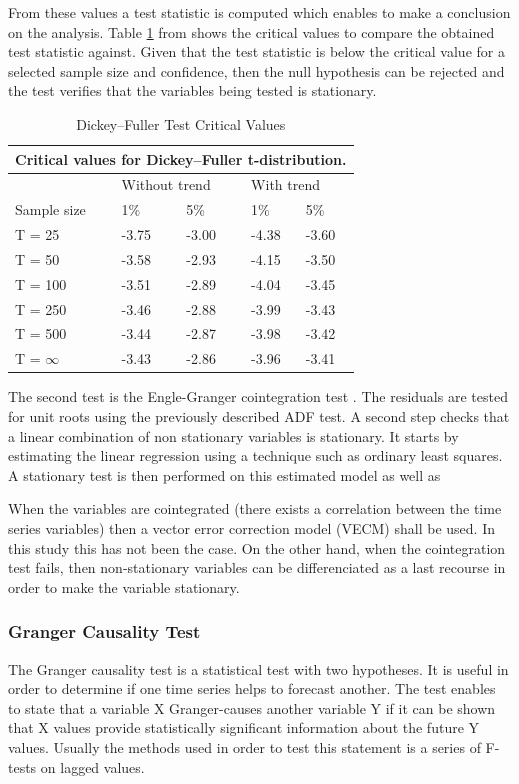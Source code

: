 From these values a test statistic is computed which enables to make a conclusion on the analysis. Table \ref{tab:adf values} from \cite{fuller2009introduction} shows the critical values to compare the obtained test statistic against. Given that the test statistic is below the critical value for a selected sample size and confidence, then the null hypothesis can be rejected and the test verifies that the variables being tested is stationary.

\begin{table}[H]
\centering
\begin{tabular}{@{}lllll@{}}
\toprule
\multicolumn{5}{c}{\textbf{Critical values for Dickey–Fuller t-distribution.}} \\ \midrule
 & \multicolumn{2}{l}{Without   trend} & \multicolumn{2}{l}{With trend} \\
Sample size & 1\% & 5\% & 1\% & 5\% \\ \midrule
T = 25 & -3.75 & -3.00 & -4.38 & -3.60 \\
T = 50 & -3.58 & -2.93 & -4.15 & -3.50 \\
T = 100 & -3.51 & -2.89 & -4.04 & -3.45 \\
T = 250 & -3.46 & -2.88 & -3.99 & -3.43 \\
T = 500 & -3.44 & -2.87 & -3.98 & -3.42 \\
T = $\infty$ & -3.43 & -2.86 & -3.96 & -3.41 \\ \bottomrule
\end{tabular}
\caption{Dickey–Fuller Test Critical Values \citep{fuller2009introduction}}
\label{tab:adf values}
\end{table}

The second test is the Engle-Granger cointegration test \citep{engle1987co}. The residuals are tested for unit roots using the previously described ADF test. A second step checks that a linear combination of non stationary variables is stationary. It starts by estimating the linear regression using a technique such as ordinary least squares. A stationary test is then performed on this estimated model as well as 

When the variables are cointegrated (there exists a correlation between the time series variables) then a vector error correction model (VECM) shall be used. In this study this has not been the case. On the other hand, when the cointegration test fails, then non-stationary variables can be differenciated as a last recourse in order to make the variable stationary.

\subsubsection{Granger Causality Test}

The Granger causality test is a statistical test with two hypotheses. It is useful in order to determine if one time series helps to forecast another. The test enables to state that a variable X Granger-causes another variable Y if it can be shown that X values provide statistically significant information about the future Y values. Usually the methods used in order to test this statement is a series of F-tests on lagged values.
